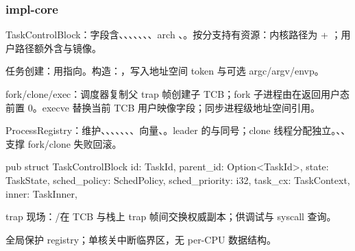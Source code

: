 
\subsubsection{impl-core}

TaskControlBlock：字段含、、、、、、、arch 、。按分支持有资源：内核路径为 + ；用户路径额外含与镜像。

任务创建：用指向。构造：，写入地址空间 token 与可选 argc/argv/envp。

fork/clone/exec：调度器复制父 trap 帧创建子 TCB；fork 子进程由在返回用户态前置 0。execve 替换当前 TCB 用户映像字段；同步进程级地址空间引用。

ProcessRegistry：维护、、、、、、、向量、。leader 的与同号；clone 线程分配独立。、、支撑 fork/clone 失败回滚。

\begin{rustcode}
pub struct TaskControlBlock {
    id: TaskId,
    parent_id: Option<TaskId>,
    state: TaskState,
    sched_policy: SchedPolicy,
    sched_priority: i32,
    task_cx: TaskContext,
    inner: TaskInner,
}
\end{rustcode}

trap 现场：/在 TCB 与栈上 trap 帧间交换权威副本；供调试与 syscall 查询。

全局保护 registry；单核关中断临界区，无 per-CPU 数据结构。

